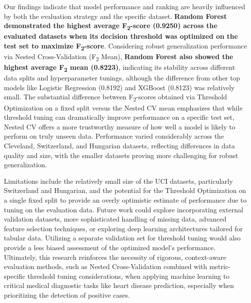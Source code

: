 \documentclass{article}
\begin{document}
Our findings indicate that model performance and ranking are heavily influenced by both the evaluation strategy and the specific dataset. \textbf{Random Forest demonstrated the highest average F\textsubscript{2}-score (0.9250) across the evaluated datasets when its decision threshold was optimized on the test set to maximize F\textsubscript{2}-score}. Considering robust generalization performance via Nested Cross-Validation (F\textsubscript{2} Mean), \textbf{Random Forest also showed the highest average F\textsubscript{2} mean (0.8223)}, indicating its stability across different data splits and hyperparameter tunings, although the difference from other top models like Logistic Regression (0.8192) and XGBoost (0.8123) was relatively small. The substantial difference between F\textsubscript{2}-scores obtained via Threshold Optimization on a fixed split versus the Nested CV mean emphasizes that while threshold tuning can dramatically improve performance on a specific test set, Nested CV offers a more trustworthy measure of how well a model is likely to perform on truly unseen data. Performance varied considerably across the Cleveland, Switzerland, and Hungarian datasets, reflecting differences in data quality and size, with the smaller datasets proving more challenging for robust generalization.

Limitations include the relatively small size of the UCI datasets, particularly Switzerland and Hungarian, and the potential for the Threshold Optimization on a single fixed split to provide an overly optimistic estimate of performance due to tuning on the evaluation data. Future work could explore incorporating external validation datasets, more sophisticated handling of missing data, advanced feature selection techniques, or exploring deep learning architectures tailored for tabular data. Utilizing a separate validation set for threshold tuning would also provide a less biased assessment of the optimized model's performance. Ultimately, this research reinforces the necessity of rigorous, context-aware evaluation methods, such as Nested Cross-Validation combined with metric-specific threshold tuning considerations, when applying machine learning to critical medical diagnostic tasks like heart disease prediction, especially when prioritizing the detection of positive cases.


\label{sec:references}
\end{document}
